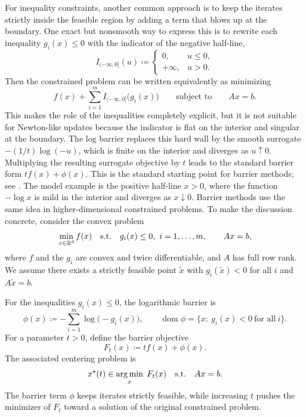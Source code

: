 For inequality constraints, another common approach is to keep the iterates strictly inside the feasible region by adding a term that blows up at the boundary.
One exact but nonsmooth way to express this is to rewrite each inequality $g_i(x)\le 0$ with the indicator of the negative half-line,
\[
  I_{(-\infty,0]}(u)
  \coloneqq
  \begin{cases}
    0, & u\le 0,\\
    +\infty, & u>0.
  \end{cases}
\]
Then the constrained problem can be written equivalently as minimizing
\[
  f(x) + \sum_{i=1}^m I_{(-\infty,0]}\bigl(g_i(x)\bigr)
  \qquad \text{subject to} \qquad Ax=b.
\]
This makes the role of the inequalities completely explicit, but it is not suitable for Newton-like updates because the indicator is flat on the interior and singular at the boundary.
The log barrier replaces this hard wall by the smooth surrogate $-(1/t)\log(-u)$, which is finite on the interior and diverges as $u\uparrow 0$.
Multiplying the resulting surrogate objective by $t$ leads to the standard barrier form $t f(x)+\phi(x)$.
This is the standard starting point for barrier methods; see \citet[\S11.3]{boyd_vandenberghe_2004_convex}.
The model example is the positive half-line \(x>0\), where the function \(-\log x\) is mild in the interior and diverges as \(x\downarrow 0\).
Barrier methods use the same idea in higher-dimensional constrained problems.
To make the discussion concrete, consider the convex problem
\begin{equation}
  \min_{x\in\mathbb{R}^d} f(x)
  \quad\text{s.t.}\quad
  g_i(x)\le 0,\ i=1,\dots,m,
  \qquad
  Ax=b,
  \label{eq:barrier-primal}
\end{equation}
where $f$ and the $g_i$ are convex and twice differentiable, and $A$ has full row rank.
We assume there exists a strictly feasible point $\tilde x$ with $g_i(\tilde x)<0$ for all $i$ and $A\tilde x=b$.

For the inequalities $g_i(x)\le 0$, the logarithmic barrier is
\[
  \phi(x) \coloneqq -\sum_{i=1}^m \log\bigl(-g_i(x)\bigr),
  \qquad
  \operatorname{dom}\phi = \{x:\ g_i(x)<0\ \text{for all}\ i\}.
\]
For a parameter $t>0$, define the barrier objective
\[
  F_t(x)\coloneqq t f(x)+\phi(x).
\]
The associated centering problem is
\begin{equation}
  x^\star(t)\in \operatorname*{arg\,min}_{x}\; F_t(x)
  \quad\text{s.t.}\quad
  Ax=b.
  \label{eq:centering-problem}
\end{equation}
The barrier term $\phi$ keeps iterates strictly feasible, while increasing $t$ pushes the minimizer of $F_t$ toward a solution of the original constrained problem.

